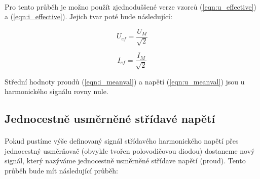 \documentclass{praktikum}
\begin{document}
\paragraph{}
Pro tento průběh je možno použít zjednoduššené verze vzorců (\ref{eqn:u_effective}) a (\ref{eqn:i_effective}). Jejich tvar poté bude následující:

\begin{equation}
\label{eqn:u_effective_harmonic}
U_{ef} = \frac{U_M}{\sqrt{2}}
\end{equation}

\begin{equation}
\label{eqn:i_effective_harmonic}
I_{ef} = \frac{I_M}{\sqrt{2}}
\end{equation}

Střední hodnoty proudů (\ref{eqn:i_meanval}) a napětí (\ref{eqn:u_meanval}) jsou u harmonického signálu rovny nule.

\subsection{Jednocestně usměrněné střídavé napětí}
\paragraph{}
Pokud pustíme výše definovaný signál střídavého harmonického napětí přes jednocestný usměrňovač (obvykle tvořen polovodičovou diodou) dostaneme nový signál, který nazýváme jednocestně usměrněné střídave napětí (proud). Tento průběh bude mít následující průběh:

\begin{center}
\end{center}
\end{document}
